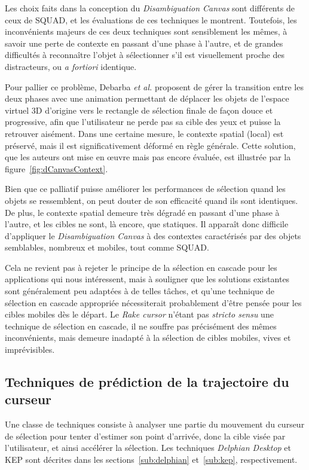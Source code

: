 	Les choix faits dans la conception du \emph{Disambiguation Canvas} sont différents de ceux de SQUAD, et les évaluations de ces techniques le montrent. Toutefois, les inconvénients majeurs de ces deux techniques sont sensiblement les mêmes, à savoir une perte de contexte en passant d'une phase à l'autre, et de grandes difficultés à reconnaître l'objet à sélectionner s'il est visuellement proche des distracteurs, ou \emph{a fortiori} identique.
	
	Pour pallier ce problème, Debarba \emph{et al.} proposent de gérer la transition entre les deux phases avec une animation permettant de déplacer les objets de l'espace virtuel 3D d'origine vers le rectangle de sélection finale de façon \og douce \fg{} et progressive, afin que l'utilisateur ne perde pas sa cible des yeux et puisse la retrouver aisément. Dans une certaine mesure, le contexte spatial (local) est préservé, mais il est significativement déformé en règle générale. Cette solution, que les auteurs ont mise en \oe{}uvre mais pas encore évaluée, est illustrée par la figure~\ref{fig:dCanvasContext}.
		
	Bien que ce palliatif puisse améliorer les performances de sélection quand les objets se ressemblent, on peut douter de son efficacité quand ils sont identiques. De plus, le contexte spatial demeure très dégradé en passant d'une phase à l'autre, et les cibles ne sont, là encore, que statiques. Il apparaît donc difficile d'appliquer le \emph{Disambiguation Canvas} à des contextes caractérisés par des objets semblables, nombreux et mobiles, tout comme SQUAD.
	
	Cela ne revient pas à rejeter le principe de la sélection en cascade pour les applications qui nous intéressent, mais à souligner que les solutions existantes sont généralement peu adaptées à de telles tâches, et qu'une technique de sélection en cascade appropriée nécessiterait probablement d'être pensée pour les cibles mobiles dès le départ. Le \emph{Rake cursor} n'étant pas \emph{stricto sensu} une technique de sélection en cascade, il ne souffre pas précisément des mêmes inconvénients, mais demeure inadapté à la sélection de cibles mobiles, vives et imprévisibles.
	
	\subsection{Techniques de prédiction de la trajectoire du curseur}
	Une classe de techniques consiste à analyser une partie du mouvement du curseur de sélection pour tenter d'estimer son point d'arrivée, donc la cible visée par l'utilisateur, et ainsi accélérer la sélection. Les techniques \emph{Delphian Desktop} et KEP sont décrites dans les sections~\ref{sub:delphian} et~\ref{sub:kep}, respectivement.

